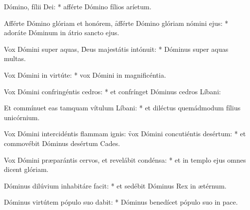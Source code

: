 \begin{psalmus}

     Dómino, fílii Dei: * afférte Dómino fílios aríetum.

    Afférte Dómino glóriam et honórem, \f afférte Dómino glóriam nómini ejus: * adoráte Dóminum in átrio sancto ejus.

    Vox Dómini super aquas, \f Deus majestátis intónuit: * Dóminus super aquas multas.

    Vox Dómini in virtúte: * vox Dómini in magnificéntia.

    Vox Dómini confringéntis cedros: * et confrínget Dóminus cedros Líbani:

    Et commínuet eas tamquam vítulum Líbani: * et diléctus quemádmodum fílius unicórnium.

    Vox Dómini intercidéntis flammam ignis: \f vox Dómini concutiéntis desértum: * et commovébit Dóminus desértum Cades.

    Vox Dómini præparántis cervos, et revelábit condénsa: * et in templo ejus omnes dicent glóriam.

    Dóminus dilúvium inhabitáre facit: * et sedébit Dóminus Rex in ætérnum.

    Dóminus virtútem pópulo suo dabit: * Dóminus benedícet pópulo suo in pace.

\end{psalmus}
